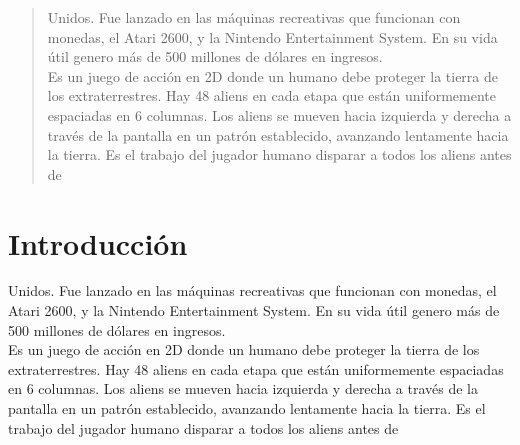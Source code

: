 \documentclass[a4paper]{article}
\begin{document}
    \vfill
\newpage
\tableofcontents
\newpage
\clearpage
\begin{abstract}
Unidos. Fue lanzado en las máquinas recreativas que funcionan con monedas, el Atari 2600, y la Nintendo Entertainment System. En su vida útil genero más de 500 millones de dólares en ingresos.\\
Es un juego de acción en 2D donde un humano debe proteger la tierra de los extraterrestres. Hay 48 aliens en cada etapa que están uniformemente espaciadas en 6 columnas. Los aliens se mueven hacia izquierda y derecha a través de la pantalla en un patrón establecido, avanzando lentamente hacia la tierra. Es el trabajo del jugador humano disparar a todos los aliens antes de\end{abstract}
\section{Introducci\'on}
Unidos. Fue lanzado en las máquinas recreativas que funcionan con monedas, el Atari 2600, y la Nintendo Entertainment System. En su vida útil genero más de 500 millones de dólares en ingresos.\\
Es un juego de acción en 2D donde un humano debe proteger la tierra de los extraterrestres. Hay 48 aliens en cada etapa que están uniformemente espaciadas en 6 columnas. Los aliens se mueven hacia izquierda y derecha a través de la pantalla en un patrón establecido, avanzando lentamente hacia la tierra. Es el trabajo del jugador humano disparar a todos los aliens antes de
\end{document}

